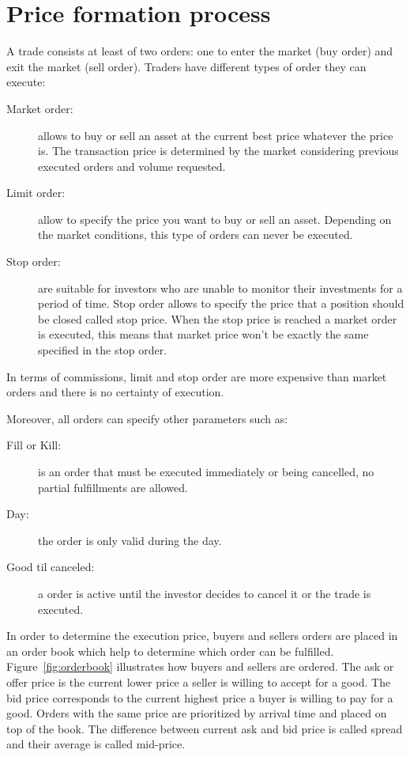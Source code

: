 \section{Price formation process}

A trade consists at least of two orders: one to enter the market (buy order) and
exit the market (sell order). Traders have different types of order they can
execute:

\begin{description}
\item[Market order:] allows to buy or sell an asset at the current best price
whatever the price is. The transaction price is determined by the market
considering previous executed orders and volume requested.
\item[Limit order:] allow to specify the price you want to buy or sell an asset.
Depending on the market conditions, this type of orders can never be executed.
\item[Stop order:] are suitable for investors who are unable to monitor their
investments for a period of time. Stop order allows to specify the price that a
position should be closed called stop price. When the stop price is reached a
market order is executed, this means that market price won't be exactly the same
specified in the stop order.
\end{description}

In terms of commissions, limit and stop order are more expensive than market orders and
there is no certainty of execution.

Moreover, all orders can specify other parameters such as: 

\begin{description}
\item[Fill or Kill:] is an order that must be executed immediately or being
cancelled, no partial fulfillments are allowed. 
\item[Day:] the order is only valid during the day.
\item[Good til canceled:] a order is active until the investor decides to cancel
it or the trade is executed.
\end{description}

In order to determine the execution price, buyers and sellers orders are placed
in an order book which help to determine which order can be fulfilled.
Figure~\ref{fig:orderbook} illustrates how buyers and sellers are ordered. The
ask or offer price is the current lower price a seller is willing to accept for
a good. The bid price corresponds to the current highest price a buyer is
willing to pay for a good. Orders with the same price are prioritized by
arrival time and placed on top of the book.  The difference between current ask and bid
price is called spread and their average is called mid-price.

